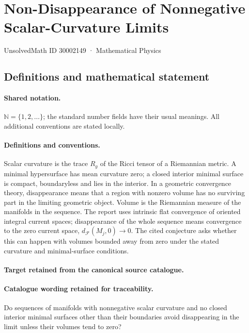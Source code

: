 \documentclass[11pt]{article}
\begin{document}
\setcounter{section}{30002148}
\section{Non-Disappearance of Nonnegative Scalar-Curvature Limits}\label{30002149}
{\small UnsolvedMath ID 30002149 · Mathematical Physics}
\subsection{Definitions and mathematical statement}

\paragraph{Shared notation.}$\mathbb N=\{1,2,\ldots\}$; the standard number fields have their usual meanings. All additional conventions are stated locally.


\paragraph{Definitions and conventions.}
Scalar curvature is the trace $R_g$ of the Ricci tensor of a Riemannian metric. A minimal hypersurface has mean curvature zero; a closed interior minimal surface is compact, boundaryless and lies in the interior. In a geometric convergence theory, disappearance means that a region with nonzero volume has no surviving part in the limiting geometric object. Volume is the Riemannian measure of the manifolds in the sequence. The report uses intrinsic flat convergence of oriented integral current spaces; disappearance of the whole sequence means convergence to the zero current space, $d_{\mathcal F}(M_j,0)\to0$. The cited conjecture asks whether this can happen with volumes bounded away from zero under the stated curvature and minimal-surface conditions.

\paragraph{Target retained from the canonical source catalogue.}
\paragraph{Catalogue wording retained for traceability.}
Do sequences of manifolds with nonnegative scalar curvature and no closed interior minimal surfaces other than their boundaries avoid disappearing in the limit unless their volumes tend to zero?
\end{document}
